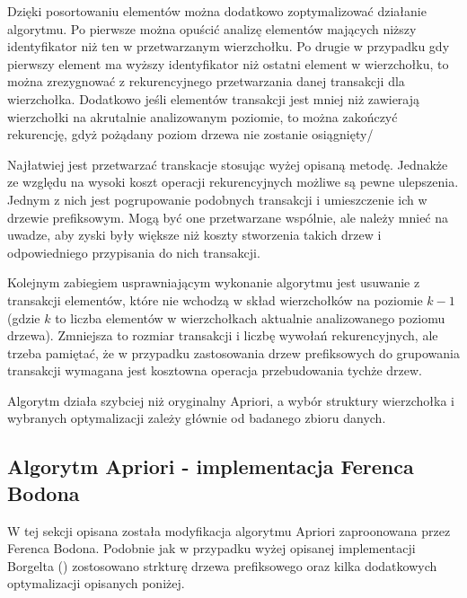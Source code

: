 Dzięki posortowaniu elementów można dodatkowo zoptymalizować działanie algorytmu. Po pierwsze można opuścić analizę elementów mających niższy identyfikator niż ten w przetwarzanym wierzchołku. Po drugie w przypadku gdy pierwszy element ma wyższy identyfikator niż ostatni element w wierzchołku, to można zrezygnować z rekurencyjnego przetwarzania danej transakcji dla wierzchołka. Dodatkowo jeśli elementów transakcji jest mniej niż zawierają wierzchołki na akrutalnie analizowanym poziomie, to można zakończyć rekurencję, gdyż pożądany poziom drzewa nie zostanie osiągnięty/

Najłatwiej jest przetwarzać transkacje stosując wyżej opisaną metodę. Jednakże ze względu na wysoki koszt operacji rekurencyjnych możliwe są pewne ulepszenia. Jednym z nich jest pogrupowanie podobnych transakcji i umieszczenie ich w drzewie prefiksowym. Mogą być one przetwarzane wspólnie, ale należy mnieć na uwadze, aby zyski były większe niż koszty stworzenia takich drzew i odpowiedniego przypisania do nich transakcji. 

Kolejnym zabiegiem usprawniającym wykonanie algorytmu jest usuwanie z transakcji elementów, które nie wchodzą w skład wierzchołków na poziomie \(k-1\) (gdzie \(k\) to liczba elementów w wierzchołkach aktualnie analizowanego poziomu drzewa). Zmniejsza to rozmiar transakcji i liczbę wywołań rekurencyjnych, ale trzeba pamiętać, że w przypadku zastosowania drzew prefiksowych do grupowania transakcji wymagana jest kosztowna operacja przebudowania tychże drzew.

Algorytm działa szybciej niż oryginalny Apriori, a wybór struktury wierzchołka i wybranych optymalizacji zależy głównie od badanego zbioru danych. 

\subsection{Algorytm Apriori - implementacja Ferenca Bodona \cite{Bodon}}
\label{c323}
W tej sekcji opisana została modyfikacja algorytmu Apriori zaproonowana przez Ferenca Bodona. Podobnie jak w przypadku wyżej opisanej implementacji Borgelta (\cite{Borgelt}) zostosowano strkturę drzewa prefiksowego oraz kilka dodatkowych optymalizacji opisanych poniżej. 

